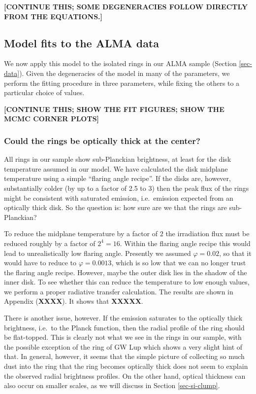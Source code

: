 \documentclass{aa}
\begin{document}
{\bf [CONTINUE THIS; SOME DEGENERACIES FOLLOW DIRECTLY FROM THE EQUATIONS.]}


\subsection{Model fits to the ALMA data}
\label{sec-anmodel-fits-to-data}
%
We now apply this model to the isolated rings in our ALMA sample (Section
\ref{sec-data}). Given the degeneracies of the model in many of the parameters,
we perform the fitting procedure in three parameters, while fixing the others
to a particular choice of values. 



{\bf [CONTINUE THIS; SHOW THE FIT FIGURES; SHOW THE MCMC CORNER PLOTS]}







\subsubsection{Could the rings be optically thick at the center?}
\label{sec-anmodel-fits-optically-thick}
%
All rings in our sample show sub-Planckian brightness, at least for the disk
temperature assumed in our model. We have calculated the disk midplane temperature
using a simple ``flaring angle recipe''. If the disks are, however, substantially
colder (by up to a factor of 2.5 to 3) then the peak flux of the rings might be
consistent with saturated emission, i.e.\ emission expected from an optically thick
disk. So the question is: how sure are we that the rings are sub-Planckian? 

To reduce the midplane temperature by a factor of $2$ the irradiation flux must
be reduced roughly by a factor of $2^4=16$. Within the flaring angle recipe this
would lead to unrealistically low flaring angle. Presently we assumed $\varphi=0.02$,
so that it would have to reduce to $\varphi=0.0013$, which is so low that we can no
longer trust the flaring angle recipe. However, maybe the outer disk lies in the
shadow of the inner disk. To see whether this can reduce the temperature to low
enough values, we perform a proper radiative transfer calculation. The results are
shown in Appendix ({\bf XXXX}). It shows that {\bf XXXXX}.

There is another issue, however. If the emission saturates to the optically thick
brightness, i.e.\ to the Planck function, then the radial profile of the ring should
be flat-topped. This is clearly not what we see in the rings in our sample, with
the possible exception of the ring of GW Lup which shows a very slight hint of that.
In general, however, it seems that the simple picture of collecting so much dust into
the ring that the ring becomes optically thick does not seem to explain the observed
radial brightness profiles. On the other hand, optical thickness can also occur
on smaller scales, as we will discuss in Section \ref{sec-si-clump}.
\end{document}
